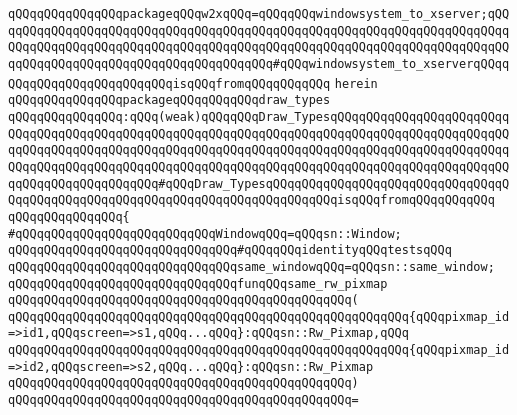 \verb|qQQqqQQqqQQqqQQqpackageqQQqw2xqQQq=qQQqqQQqwindowsystem_to_xserver;qQQqqQQqqQQqqQQqqQQqqQQqqQQqqQQqqQQqqQQqqQQqqQQqqQQqqQQqqQQqqQQqqQQqqQQqqQQqqQQqqQQqqQQqqQQqqQQqqQQqqQQqqQQqqQQqqQQqqQQqqQQqqQQqqQQqqQQqqQQqqQQqqQQqqQQqqQQqqQQqqQQqqQQqqQQqqQQqqQQq#qQQqwindowsystem_to_xserverqQQqqQQqqQQqqQQqqQQqqQQqqQQqisqQQqfromqQQqqQQqqQQq|\newline
\verb|herein|\newline
\newline
\verb|qQQqqQQqqQQqqQQqpackageqQQqqQQqqQQqdraw_types|\newline
\verb|qQQqqQQqqQQqqQQq:qQQq(weak)qQQqqQQqDraw_TypesqQQqqQQqqQQqqQQqqQQqqQQqqQQqqQQqqQQqqQQqqQQqqQQqqQQqqQQqqQQqqQQqqQQqqQQqqQQqqQQqqQQqqQQqqQQqqQQqqQQqqQQqqQQqqQQqqQQqqQQqqQQqqQQqqQQqqQQqqQQqqQQqqQQqqQQqqQQqqQQqqQQqqQQqqQQqqQQqqQQqqQQqqQQqqQQqqQQqqQQqqQQqqQQqqQQqqQQqqQQqqQQqqQQqqQQqqQQqqQQqqQQqqQQqqQQqqQQq#qQQqDraw_TypesqQQqqQQqqQQqqQQqqQQqqQQqqQQqqQQqqQQqqQQqqQQqqQQqqQQqqQQqqQQqqQQqqQQqqQQqqQQqqQQqisqQQqfromqQQqqQQqqQQq|\newline
\verb|qQQqqQQqqQQqqQQq{|\newline
\verb|#qQQqqQQqqQQqqQQqqQQqqQQqqQQqWindowqQQq=qQQqsn::Window;|\newline
\newline
\verb|qQQqqQQqqQQqqQQqqQQqqQQqqQQqqQQq#qQQqqQQqidentityqQQqtestsqQQq|\newline
\newline
\verb|qQQqqQQqqQQqqQQqqQQqqQQqqQQqqQQqsame_windowqQQq=qQQqsn::same_window;|\newline
\newline
\verb|qQQqqQQqqQQqqQQqqQQqqQQqqQQqqQQqfunqQQqsame_rw_pixmap|\newline
\verb|qQQqqQQqqQQqqQQqqQQqqQQqqQQqqQQqqQQqqQQqqQQqqQQq(|\newline
\verb|qQQqqQQqqQQqqQQqqQQqqQQqqQQqqQQqqQQqqQQqqQQqqQQqqQQqqQQq{qQQqpixmap_id=>id1,qQQqscreen=>s1,qQQq...qQQq}:qQQqsn::Rw_Pixmap,qQQq|\newline
\verb|qQQqqQQqqQQqqQQqqQQqqQQqqQQqqQQqqQQqqQQqqQQqqQQqqQQqqQQq{qQQqpixmap_id=>id2,qQQqscreen=>s2,qQQq...qQQq}:qQQqsn::Rw_Pixmap|\newline
\verb|qQQqqQQqqQQqqQQqqQQqqQQqqQQqqQQqqQQqqQQqqQQqqQQq)|\newline
\verb|qQQqqQQqqQQqqQQqqQQqqQQqqQQqqQQqqQQqqQQqqQQqqQQq=|\newline
